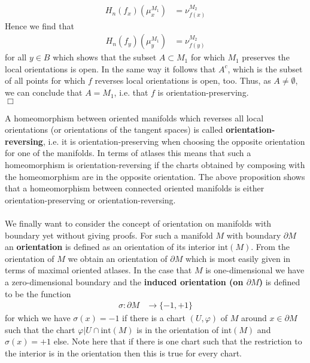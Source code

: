 \begin{prf}
\begin{align*}
  H_{n}(f_{x})(\mu_{x}^{M_{1}})
  &=
  \nu_{f(x)}^{M_{2}}
\end{align*}
Hence we find that
\begin{align*}
  H_{n}(f_{y})(\mu_{y}^{M_{1}})
  &=
  \nu_{f(y)}^{M_{2}}
\end{align*}
for all $y \in B$ which shows that the subset $A \subset M_{1}$ for which $M_{1}$ preserves the local orientations is open. In the same way it follows that $A^{c}$, which is the subset of all points for which $f$ reverses local orientations is open, too. Thus, as $A \neq \emptyset$, we can conclude that $A = M_{1}$, i.e. that $f$ is orientation-preserving.
\\
\phantom{proven}
\hfill
$\Box$
\end{prf}
A homeomorphism between oriented manifolds which reverses all local orientations (or orientations of the tangent spaces) is called \textbf{orientation-reversing}, i.e. it is orientation-preserving when choosing the opposite orientation for one of the manifolds. In terms of atlases this means that such a homeomorphism is orientation-reversing if the charts obtained by composing with the homeomorphism are in the opposite orientation. The above proposition shows that a homeomorphism between connected oriented manifolds is either orientation-preserving or orientation-reversing.
\\\\
We finally want to consider the concept of orientation on manifolds with boundary yet without giving proofs. For such a manifold $M$ with boundary $\partial M$ an \textbf{orientation} is defined as an orientation of its interior $\mathrm{int}(M)$. From the orientation of $M$ we obtain an orientation of $\partial M$ which is most easily given in terms of maximal oriented atlases. In the case that $M$ is one-dimensional we have a zero-dimensional boundary and the \textbf{induced orientation (on $\partial M$)} is defined to be the function
\begin{align*}
  \sigma
  \colon
  \partial M
  &\to
  \lbrace
    -1
    ,
    +1
  \rbrace
\end{align*}
for which we have $\sigma(x) = -1$ if there is a chart $(U,\varphi)$ of $M$ around $x \in \partial M$ such that the chart $\varphi\vert U \cap \mathrm{int}(M)$ is in the orientation of $\mathrm{int}(M)$ and $\sigma(x) = +1$ else. Note here that if there is one chart such that the restriction to the interior is in the orientation then this is true for every chart.
\\
